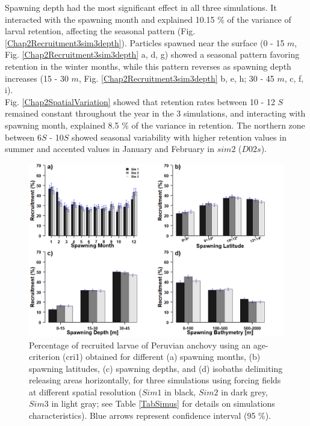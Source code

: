Spawning depth had the most significant effect in all three simulations. It interacted with the spawning month and explained 10.15 \% of the variance of larval retention, affecting the seasonal pattern (Fig. \ref{Chap2Recruitment3sim3depth}). Particles spawned near the surface (0 - 15 $m$, Fig. \ref{Chap2Recruitment3sim3depth} a, d, g) showed a seasonal pattern favoring retention in the winter months, while this pattern reverses as spawning depth increases (15 - 30 $m$, Fig. \ref{Chap2Recruitment3sim3depth} b, e, h; 30 - 45 $m$, c, f, i).\\

Fig. \ref{Chap2SpatialVariation} showed that retention rates between 10 - 12 \textdegree $S$ remained constant throughout the year in the 3 simulations, and interacting with spawning month, explained 8.5 \% of the variance in retention. The northern zone between 6\textdegree $S$ - 10\textdegree $S$ showed seasonal variability with higher retention values in summer and accented values in January and February in $sim 2$ ($D02s$).\\

\begin{figure}[H]
	\includegraphics[width=1.0\textwidth]{figures/Chap2Recruitment3bars.png}
	\centering
	\caption{Percentage of recruited larvae of Peruvian anchovy using an age-criterion (\gls{cri1}) obtained for different (a) spawning months, (b) spawning latitudes, (c) spawning depths, and (d) isobaths delimiting releasing areas horizontally, for three simulations using forcing fields at different spatial resolution ($Sim 1$ in black, $Sim 2$ in dark grey, $Sim 3$ in light gray; see Table \ref{TabSimus} for details on simulations characteristics). Blue arrows represent confidence interval (95 \%).}
	\label{Chap2Recruitment3bars}
\end{figure}

